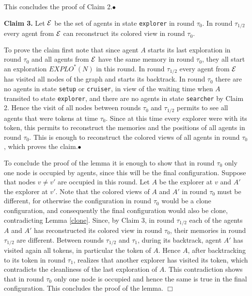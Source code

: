 \documentclass[11pt]{article}
\newcommand{\finclaim}{\hfill $\bullet$}
\newcommand{\qed}{\hfill $\Box$ \bigbreak}
\newenvironment{proof}{\noindent {\bf Proof.}}{\qed}
\newcommand{\E}{{\cal{E}}}
\begin{document}
\begin{proof}
This concludes the proof of Claim 2.\finclaim

\vspace*{0.3cm}
\noindent
{\bf Claim 3.} Let $\E$ be the set of agents in state {\tt explorer} in round $\tau_0$. 
In round $\tau_{1/2}$ every agent from $\E$ can reconstruct its colored view in round  $\tau_0$.

To prove the claim first note that since agent $A$ starts its last exploration in round $\tau_0$ and all agents from $\E$ have the same memory in round $\tau_0$,
they all start an exploration $EXPLO^*(N)$ in this round. In round $\tau_{1/2}$ every agent from $\E$ has visited all nodes of the graph and starts its backtrack.
In round $\tau_0$ there are no agents in state {\tt setup} or {\tt cruiser}, in view of the waiting time when $A$ transited to state {\tt explorer}, and there are no agents
in state {\tt searcher} by Claim 2. Hence the visit of all nodes between rounds $\tau_0$ and $\tau_{1/2}$ permits to see all agents that were tokens at time $\tau_0$.
Since at this time every explorer were with its token, this
permits to reconstruct the memories and the positions of all agents in round $\tau_0$. This is enough to reconstruct the colored views of all agents in round  $\tau_0$, which proves the claim.\finclaim

To conclude the proof of the lemma it is enough to show that in round $\tau_0$ only one node is occupied by agents, since this will be the final configuration.
Suppose that nodes $v\neq v'$ are occupied in this round. Let $A$ be the explorer at $v$ and $A'$ the explorer at $v'$. Note that the colored views of $A$ and $A'$
in round $\tau_0$
must be different, for otherwise the configuration in round $\tau_0$ would be a clone configuration, and consequently the final configuration would also be clone,
contradicting Lemma \ref{clone}. Since, by Claim 3, in round $\tau_{1/2}$ each of the agents $A$ and $A'$ has reconstructed its colored view in round  $\tau_0$, their memories in round $\tau_{1/2}$ are different. Between rounds  $\tau_{1/2}$ and $\tau_1$, during its backtrack, agent $A'$ has visited again all tokens, 
in particular the token of $A$. Hence $A$, after backtracking
to its token in round $\tau_1$,  realizes that another explorer has visited its token, which contradicts the cleanliness of the last exploration of $A$.
This contradiction shows that in round $\tau_0$ only one node is occupied and hence the same is true in the final configuration. This concludes the proof of the lemma.
\end{proof}
\end{document}
